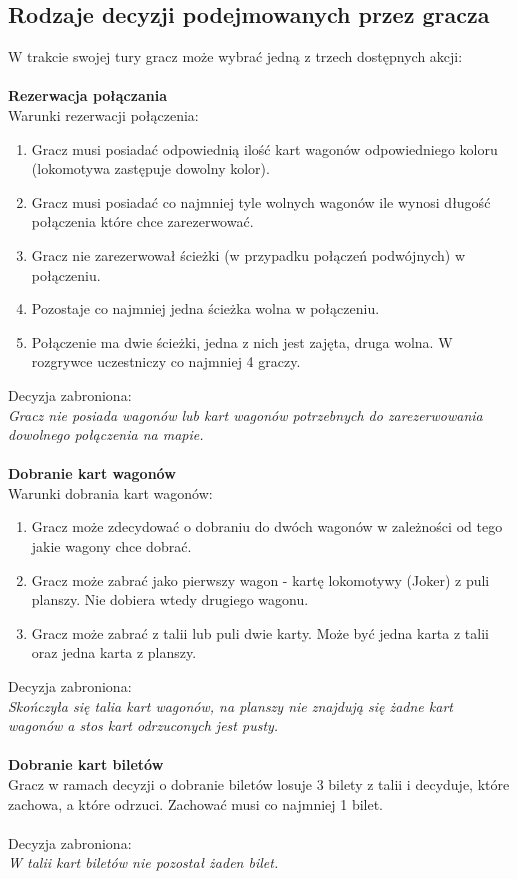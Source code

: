 \documentclass[12pt, oneside]{report}
\begin{document}
\subsection{Rodzaje decyzji podejmowanych przez gracza}
W trakcie swojej tury gracz może wybrać jedną z trzech dostępnych akcji: \\ \\
\textbf{Rezerwacja połączania} \\
Warunki rezerwacji połączenia:
\begin{enumerate}
	\item Gracz musi posiadać odpowiednią ilość kart wagonów odpowiedniego koloru (lokomotywa zastępuje dowolny kolor).
	\item Gracz musi posiadać co najmniej tyle wolnych wagonów ile wynosi długość połączenia które chce zarezerwować.
	\item Gracz nie zarezerwował ścieżki (w przypadku połączeń podwójnych) w połączeniu.
	\item Pozostaje co najmniej jedna ścieżka wolna w połączeniu.
	\item Połączenie ma dwie ścieżki, jedna z nich jest zajęta, druga wolna. W rozgrywce uczestniczy co najmniej 4 graczy.
\end{enumerate}
Decyzja zabroniona: \\
\textit{Gracz nie posiada wagonów lub kart wagonów potrzebnych do zarezerwowania dowolnego połączenia na mapie.} \\ \\
\textbf{Dobranie kart wagonów} \\
Warunki dobrania kart wagonów:
\begin{enumerate}
	\item Gracz może zdecydować o dobraniu do dwóch wagonów w zależności od tego jakie wagony chce dobrać. 
	\item Gracz może zabrać jako pierwszy wagon - kartę lokomotywy (Joker) z puli planszy. Nie dobiera wtedy drugiego wagonu.
	\item Gracz może zabrać z talii lub puli dwie karty. Może być jedna karta z talii oraz jedna karta z planszy.
\end{enumerate}
 Decyzja zabroniona: \\
 \textit{Skończyła się talia kart wagonów, na planszy nie znajdują się żadne kart wagonów a stos kart odrzuconych jest pusty.} \\ \\
\textbf{Dobranie kart biletów} \\
Gracz w ramach decyzji o dobranie biletów losuje 3 bilety z talii i decyduje, które zachowa, a które odrzuci. Zachować musi co najmniej 1 bilet. \\ \\
Decyzja zabroniona:\\
\textit{W talii kart biletów nie pozostał żaden bilet.}
\end{document}
